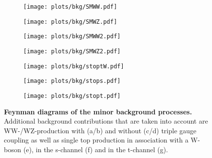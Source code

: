 \begin{figure}
	\centering
	\begin{subfigure}{0.4\textwidth}
		\texttt{[image: plots/bkg/SMWW.pdf]}
		\caption{}
		\label{fig:bkg:fy_WWtgc}
	\end{subfigure}
	\begin{subfigure}{0.4\textwidth}
		\texttt{[image: plots/bkg/SMWZ.pdf]}
		\caption{}
		\label{fig:bkg:fy_WZtgc}
	\end{subfigure}
	\begin{subfigure}{0.4\textwidth}
		\texttt{[image: plots/bkg/SMWW2.pdf]}
		\caption{}
		\label{fig:bkg:fy_WWSM}
	\end{subfigure}
	\begin{subfigure}{0.4\textwidth}
		\texttt{[image: plots/bkg/SMWZ2.pdf]}
		\caption{}
		\label{fig:bkg:fy_WZSM}
	\end{subfigure}
	\begin{subfigure}{0.3\textwidth}
		\texttt{[image: plots/bkg/stoptW.pdf]}
		\caption{}
		\label{fig:bkg:fy_stoptw}
	\end{subfigure}
	\begin{subfigure}{0.4\textwidth}
		\texttt{[image: plots/bkg/stops.pdf]}
		\caption{}
		\label{fig:bkg:fy_stops}
	\end{subfigure}
	\begin{subfigure}{\textwidth}
		\centering
		\texttt{[image: plots/bkg/stopt.pdf]}
		\caption{}
		\label{fig:bkg:fy_stopt}
	\end{subfigure}

	
	\caption[Feynman diagrams of the minor background processes.]{\textbf{Feynman diagrams of the minor background processes.} Additional background contributions that are taken into account are WW-/WZ-production with (a/b) and without (c/d) triple gauge coupling as well as single top production in association with a W-boson (e), in the s-channel (f) and in the t-channel (g).}
\end{figure}

\clearpage
